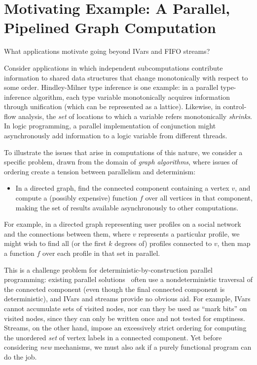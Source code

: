 \section{Motivating Example: A Parallel, Pipelined Graph Computation}\label{s:lvars-motivation}

What applications motivate going beyond IVars and FIFO streams?

Consider applications in which independent subcomputations contribute
information to shared data structures that change monotonically with
respect to some order.  Hindley-Milner type inference is one example:
in a parallel type-inference algorithm, each type variable
monotonically acquires information through unification (which can be
represented as a lattice). Likewise, in control-flow analysis, the
\emph{set} of locations to which a variable refers monotonically
\emph{shrinks}.  In logic programming, a parallel implementation of
conjunction might asynchronously add information to a logic variable
from different threads.

To illustrate the issues that arise in computations of this nature, we
consider a specific problem, drawn from the domain of {\em graph
  algorithms}, where issues of ordering create a tension between
parallelism and determinism:
\begin{itemize}
\item 
  In a directed graph, find the connected component containing a
  vertex $v$, and compute a (possibly expensive) function $f$ over all
  vertices in that component, making the set of results available
  asynchronously to other computations.
\end{itemize}
For example, in a directed graph representing user profiles on a
social network and the connections between them, where $v$ represents
a particular profile, we might wish to find all (or the first $k$
degrees of) profiles connected to $v$, then map a function $f$ over
each profile in that set in parallel.

This is a challenge problem for deterministic-by-construction parallel
programming: existing parallel solutions~\cite{bfs-pbgl} often use a
nondeterministic traversal of the connected component (even though the
final connected component is deterministic), and IVars and streams
provide no obvious aid.  For example, IVars cannot accumulate sets of
visited nodes, nor can they be used as ``mark bits'' on visited nodes,
since they can only be written once and not tested for emptiness.
Streams, on the other hand, impose an excessively strict ordering for
computing the unordered \emph{set} of vertex labels in a connected
component.  Yet before considering \emph{new} mechanisms, we must also
ask if a purely functional program can do the job.


